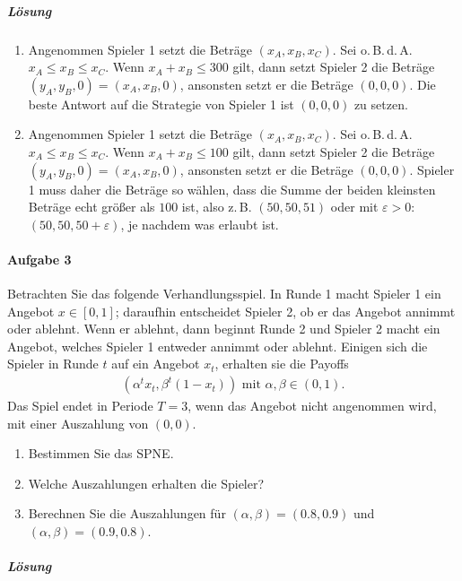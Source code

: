 \subparagraph{Lösung}%
\begin{enumerate}
  \item Angenommen Spieler 1 setzt die Beträge $(x_A, x_B, x_C)$.
    Sei o.\,B.\,d.\,A. $x_A \leq x_B \leq x_C$.
    Wenn $x_A + x_B \leq 300$ gilt, dann setzt Spieler 2 die Beträge
    $(y_A, y_B, 0) = (x_A, x_B, 0)$, ansonsten setzt er die Beträge $(0,0,0)$.
    Die beste Antwort auf die Strategie von Spieler 1 ist $(0,0,0)$ zu setzen.

  \item Angenommen Spieler 1 setzt die Beträge $(x_A, x_B, x_C)$.
    Sei o.\,B.\,d.\,A. $x_A \leq x_B \leq x_C$.
    Wenn $x_A + x_B \leq 100$ gilt, dann setzt Spieler 2 die Beträge
    $(y_A, y_B, 0) = (x_A, x_B, 0)$, ansonsten setzt er die Beträge $(0,0,0)$.
    Spieler 1 muss daher die Beträge so wählen, dass die Summe der beiden kleinsten
    Beträge echt größer als $100$ ist,
    also z.\,B. $(50,50,51)$ oder mit $ε > 0$: $(50,50,50+ε)$, je nachdem was erlaubt ist.
\end{enumerate}

\paragraph{Aufgabe 3}%
\label{par:serie_8_aufgabe_3}

Betrachten Sie das folgende Verhandlungsspiel.
In Runde 1 macht Spieler 1 ein Angebot $x \in [0, 1]$; daraufhin entscheidet Spieler 2, ob
er das Angebot annimmt oder ablehnt.
Wenn er ablehnt, dann beginnt Runde 2 und Spieler 2 macht ein Angebot, welches Spieler 1
entweder annimmt oder ablehnt.
Einigen sich die Spieler in Runde $t$ auf ein Angebot $x_t$, erhalten sie die Payoffs
\begin{align*}
  (\alpha^t x_t, \beta^t (1-x_t)) \text{ mit $\alpha, \beta \in (0,1)$.}
\end{align*}
Das Spiel endet in Periode $T=3$, wenn das Angebot nicht angenommen wird, mit einer
Auszahlung von $(0,0)$.

\begin{enumerate}
  \item Bestimmen Sie das SPNE.
  \item Welche Auszahlungen erhalten die Spieler?
  \item Berechnen Sie die Auszahlungen für
    $(\alpha, \beta) = (0.8, 0.9)$ und
    $(\alpha, \beta) = (0.9, 0.8)$.
\end{enumerate}

\subparagraph{Lösung}%

